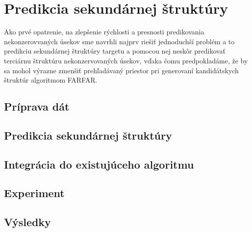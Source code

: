 \chapter{Predikcia sekundárnej štruktúry}

Ako prvé opatrenie, na zlepšenie rýchlosti a presnosti predikovania nekonzerovvaných úsekov sme navrhli najprv riešiť jednoduchší problém a to predikciu sekundárnej štruktúry targetu a pomocou nej neskôr predikovať terciárnu štruktúru nekonzervovaných úsekov, vďaka čomu predpokladáme, že by sa mohol výrazne zmenšiť prehľadávaný priestor pri generovaní kandidátskych štruktúr algoritmom FARFAR.

\section{Príprava dát}


\section{Predikcia sekundárnej štruktúry}


\section{Integrácia do existujúceho algoritmu}


\section{Experiment}


\section{Výsledky}
